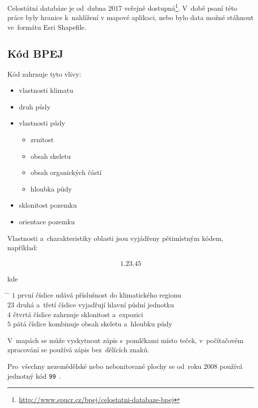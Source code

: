 Celostátní databáze  je od~dubna 2017 veřejně
dostupná\footnote{\url{http://www.spucr.cz/bpej/celostatni-databaze-bpej}}. V~době
psaní této práce byly hranice  k~nahlížení v mapové
aplikaci, nebo bylo data možné stáhnout ve~formátu Esri Shapefile.

\subsection{Kód BPEJ}
\label{kod_bpej}

Kód  zahrnuje tyto vlivy:
	\begin{itemize}[leftmargin=1.5cm, noitemsep]
		\item vlastnosti klimatu
		\item druh půdy
		\item vlastnosti půdy
			\begin{itemize}[leftmargin=1cm, noitemsep]
				\item zrnitost
				\item obsah skeletu
				\item obsah organických částí
				\item hloubka půdy
			\end{itemize}
		\item sklonitost pozemku
		\item orientace pozemku
	\end{itemize}

Vlastnosti a~charakteristiky oblasti  jsou vyjádřeny
pětimístným kódem, například:

\begin{align*} 1.23.45
\end{align*}

kde
\begin{tabbing} \hspace{2em} \= \hspace{5em} \= \kill \> $1$ \> první
číslice udává příslušnost do klimatického regionu \\ \> $23$ \> druhá
a~třetí číslice vyjadřují hlavní půdní jednotku \\ \> $4$ \> čtvrtá
číslice zahrnuje sklonitost a~expozici\\ \> $5$ \> pátá číslice
kombinuje obsah skeletu a~hloubku půdy
\end{tabbing}

V~mapách se může vyskytnout zápis s~pomlčkami místo teček,
v~počítačovém zpracování se používá zápis bez~dělících znaků.

Pro~všechny nezemědělské nebo nebonitované plochy se od~roku 2008
používá jednotný kód \texttt{99}~\citep{metodika_bpej}.


